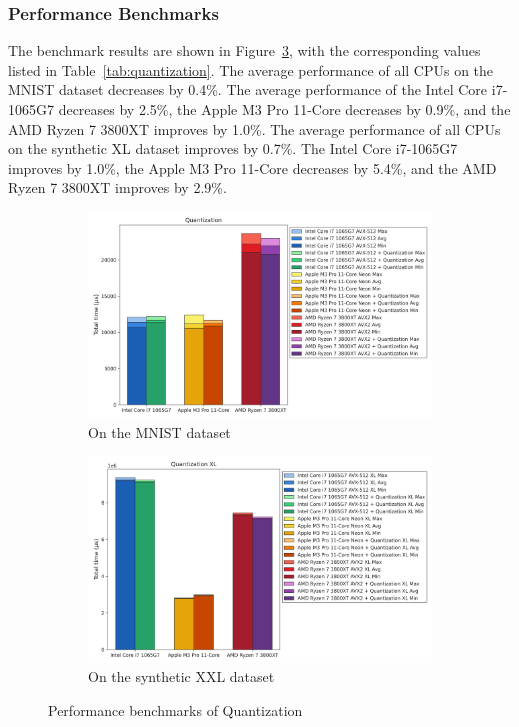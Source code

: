 \documentclass[modern,longauthor]{aastex7}
\begin{document}
\subsubsection{Performance Benchmarks}
The benchmark results are shown in Figure~\ref{fig:quantization}, with the corresponding values listed in Table~\ref{tab:quantization}. The average performance of all CPUs on the MNIST dataset decreases by 0.4\%. The average performance of the Intel Core i7-1065G7 decreases by 2.5\%, the Apple M3 Pro 11-Core decreases by 0.9\%, and the AMD Ryzen 7 3800XT improves by 1.0\%. The average performance of all CPUs on the synthetic XL dataset improves by 0.7\%. The Intel Core i7-1065G7 improves by 1.0\%, the Apple M3 Pro 11-Core decreases by 5.4\%, and the AMD Ryzen 7 3800XT improves by 2.9\%.

\begin{figure}[htb!]
\centering
\begin{subfigure}{.5\textwidth}
  \centering
  \includegraphics[width=\linewidth]{Graphs/Quantization.png}
  \caption{On the MNIST dataset}
 \label{fig:quant_mnist}
\end{subfigure}%
\begin{subfigure}{.5\textwidth}
  \centering
  \includegraphics[width=\linewidth]{Graphs/Quantization XL.png}
  \caption{On the synthetic XXL dataset}
 \label{fig:quant_xl}
\end{subfigure}
\caption{Performance benchmarks of Quantization}
\label{fig:quantization}
\end{figure}
\end{document}
